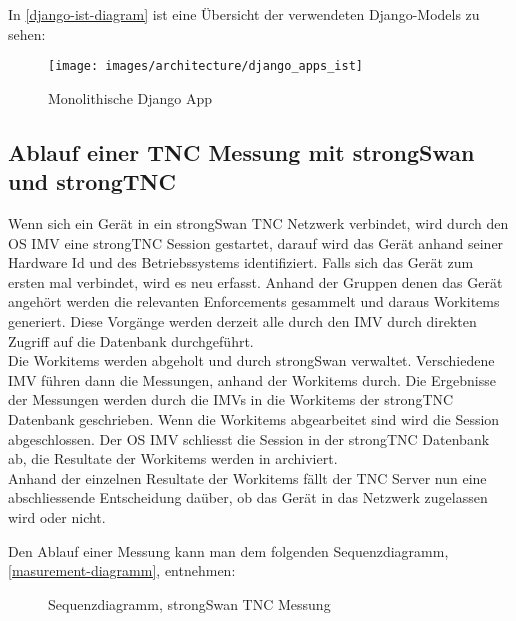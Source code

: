 In \autoref{django-ist-diagram} ist eine Übersicht der verwendeten Django-Models
zu sehen:
\begin{figure}[H]
	\centering
	\texttt{[image: images/architecture/django\_apps\_ist]}
    \caption{Monolithische Django App}
    \label{django-ist-diagram}
\end{figure}

\subsection{Ablauf einer TNC Messung mit strongSwan und strongTNC}
Wenn sich ein Gerät in ein strongSwan TNC Netzwerk verbindet, wird durch den OS
IMV eine strongTNC Session gestartet, darauf wird das Gerät anhand seiner
Hardware Id und des Betriebssystems identifiziert. Falls sich das Gerät zum
ersten mal verbindet, wird es neu erfasst. Anhand der Gruppen denen das Gerät
angehört werden die relevanten Enforcements gesammelt und daraus Workitems
generiert. Diese Vorgänge werden derzeit alle durch den IMV durch direkten
Zugriff auf die Datenbank durchgeführt.\\
Die Workitems werden abgeholt und durch strongSwan verwaltet.
Verschiedene IMV führen dann die Messungen, anhand der Workitems durch. Die
Ergebnisse der Messungen werden durch die IMVs in die Workitems der strongTNC
Datenbank geschrieben. Wenn die Workitems abgearbeitet sind wird die Session
abgeschlossen. Der OS IMV schliesst die Session in der strongTNC Datenbank ab,
die Resultate der Workitems werden in archiviert.\\
Anhand der einzelnen Resultate der Workitems fällt der TNC Server nun eine
abschliessende Entscheidung daüber, ob das Gerät in das Netzwerk zugelassen wird
oder nicht.

Den Ablauf einer Messung kann man dem folgenden Sequenzdiagramm,
\autoref{masurement-diagramm}, entnehmen:
\begin{figure}[H]	
	\centering
	
	\caption{Sequenzdiagramm, strongSwan TNC Messung}
	\label{masurement-diagramm}
\end{figure}

